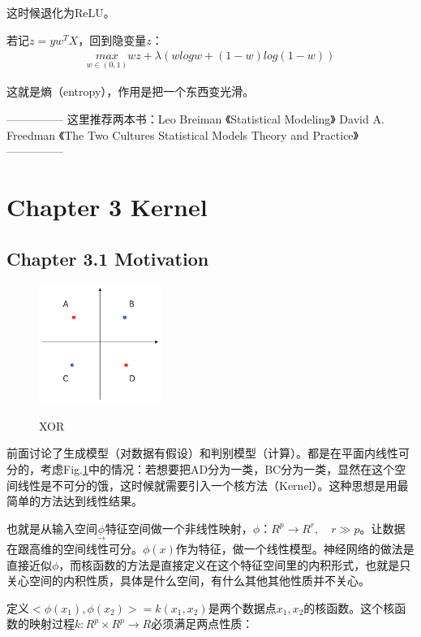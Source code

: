 \documentclass[12pt,UTF8,AutoFakeBold]{article}
\begin{document}
这时候退化为ReLU。

若记$z=yw^TX$，回到隐变量$z$：
\begin{gather}
\underset { w\in (0,1) }{ max } wz+\lambda (wlogw+(1-w)log(1-w))
\end{gather}

这就是熵（entropy），作用是把一个东西变光滑。

---------------
这里推荐两本书：Leo Breiman 《Statistical Modeling》
                David A. Freedman 《The Two Cultures Statistical Models Theory and Practice》
---------------

\section{Chapter 3  Kernel}


\subsection{Chapter 3.1 Motivation}

\begin{figure}%
\includegraphics[width=4cm]{figs/XOR.png}\\
\caption{XOR}\label{fig4}
\end{figure}

前面讨论了生成模型（对数据有假设）和判别模型（计算）。都是在平面内线性可分的，考虑Fig.\ref{fig4}中的情况：若想要把AD分为一类，BC分为一类，显然在这个空间线性是不可分的饿，这时候就需要引入一个核方法（Kernel）。这种思想是用最简单的方法达到线性结果。

也就是从输入空间$\underset { \longrightarrow  }{ \phi  } $特征空间做一个非线性映射，$\phi ：{ R }^{ p }\rightarrow { R }^{ r },\quad r\gg p$。让数据在跟高维的空间线性可分。$\phi(x)$作为特征，做一个线性模型。神经网络的做法是直接近似$\phi$，而核函数的方法是直接定义在这个特征空间里的内积形式，也就是只关心空间的内积性质，具体是什么空间，有什么其他其他性质并不关心。

定义$<\phi(x_1),\phi(x_2)>=k(x_1,x_2)$是两个数据点$x_1,x_2$的核函数。这个核函数的映射过程$k:R^p \times R^p \rightarrow R$必须满足两点性质：
\end{document}

